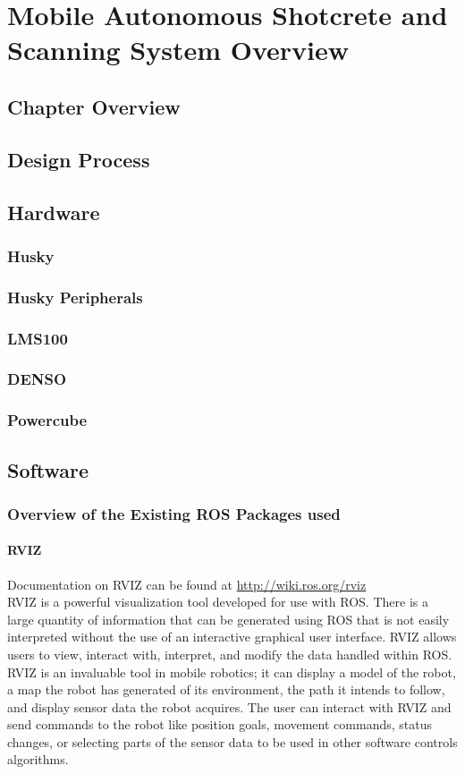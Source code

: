\chapter{Mobile Autonomous Shotcrete and Scanning System Overview}
\label{chap:overview}
\section{Chapter Overview}
\section{Design Process}
\label{sec:design}
\section{Hardware}
\subsection{Husky}
\subsection{Husky Peripherals}
\subsection{LMS100}
\subsection{DENSO}
\subsection{Powercube}
\section{Software}
\label{sec:software}
\subsection{Overview of the Existing ROS Packages used}
\subsubsection{RVIZ}
\label{sec:rviz}

Documentation on RVIZ can be found at \url{http://wiki.ros.org/rviz}\\

RVIZ is a powerful visualization tool developed for use with ROS. There is a large quantity of information that can be generated using ROS that is not easily interpreted without the use of an interactive graphical user interface. RVIZ allows users to view, interact with, interpret, and modify the data handled within ROS. RVIZ is an invaluable tool in mobile robotics; it can display a model of the robot, a map the robot has generated of its environment, the path it intends to follow, and display sensor data the robot acquires. The user can interact with RVIZ and send commands to the robot like position goals, movement commands, status changes, or selecting parts of the sensor data to be used in other software controls algorithms.\\


